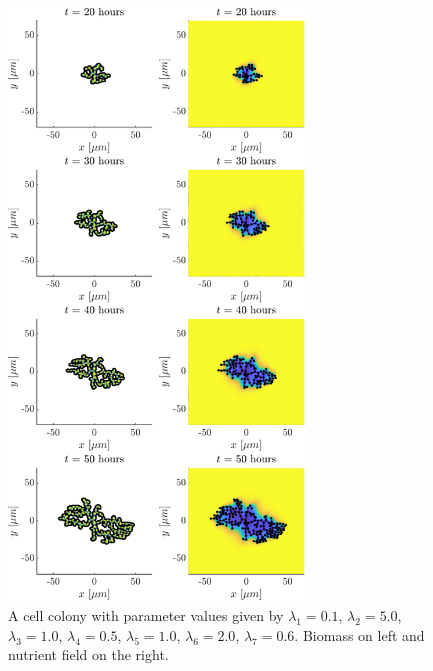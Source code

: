 \begin{figure}[!htb] %
    \centering
    \includegraphics[width= 0.7\textwidth]{
        chapter2/figures/t_all__L1_0o10_L2_5o00_L3_1o00_L4_0o50_L5_1o00_L6_2o00_L7_0o60.pdf}
    \caption{A cell colony with parameter values given by
             $\lambda_1 = 0.1$,  
             $\lambda_2 = 5.0$, 
             $\lambda_3 = 1.0$, 
             $\lambda_4 = 0.5$, 
             $\lambda_5 = 1.0$, 
             $\lambda_6 = 2.0$, 
             $\lambda_7 = 0.6$. 
             Biomass on left and nutrient field on the right.}
    \label{fig: sdsd}
\end{figure}


